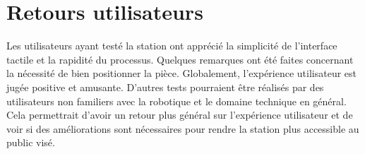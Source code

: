\section{Retours utilisateurs}

Les utilisateurs ayant testé la station ont apprécié la simplicité de l'interface tactile et la rapidité du processus. Quelques remarques ont été faites concernant la nécessité de bien positionner la pièce. Globalement, l'expérience utilisateur est jugée positive et amusante. D'autres tests pourraient être réalisés par des utilisateurs non familiers avec la robotique et le domaine technique en général. Cela permettrait d'avoir un retour plus général sur l'expérience utilisateur et de voir si des améliorations sont nécessaires pour rendre la station plus accessible au public visé.

